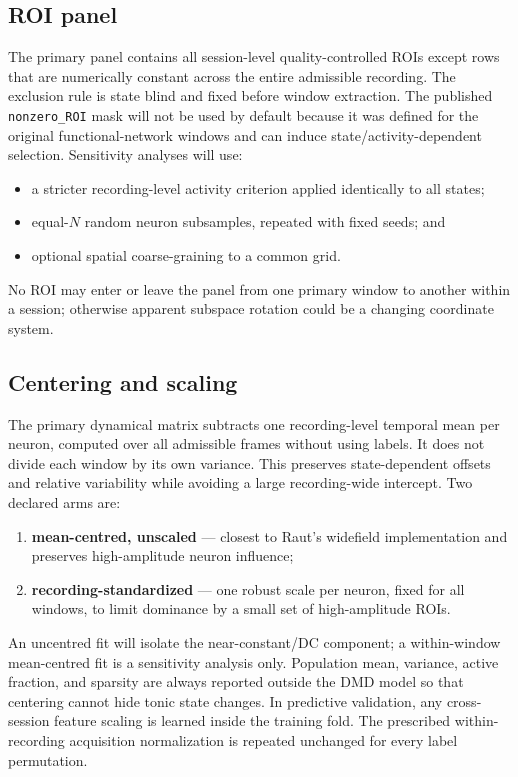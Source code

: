 \documentclass[11pt,a4paper]{article}
\begin{document}
\subsection{ROI panel}

The primary panel contains all session-level quality-controlled ROIs except rows that are numerically constant across the entire admissible recording. The exclusion rule is state blind and fixed before window extraction. The published \texttt{nonzero\_ROI} mask will not be used by default because it was defined for the original functional-network windows and can induce state/activity-dependent selection. Sensitivity analyses will use:

\begin{itemize}
  \item a stricter recording-level activity criterion applied identically to all states;
  \item equal-$N$ random neuron subsamples, repeated with fixed seeds; and
  \item optional spatial coarse-graining to a common grid.
\end{itemize}

No ROI may enter or leave the panel from one primary window to another within a session; otherwise apparent subspace rotation could be a changing coordinate system.

\subsection{Centering and scaling}

The primary dynamical matrix subtracts one recording-level temporal mean per neuron, computed over all admissible frames without using labels. It does not divide each window by its own variance. This preserves state-dependent offsets and relative variability while avoiding a large recording-wide intercept. Two declared arms are:

\begin{enumerate}
  \item \textbf{mean-centred, unscaled} --- closest to Raut's widefield implementation and preserves high-amplitude neuron influence;
  \item \textbf{recording-standardized} --- one robust scale per neuron, fixed for all windows, to limit dominance by a small set of high-amplitude ROIs.
\end{enumerate}

An uncentred fit will isolate the near-constant/DC component; a within-window mean-centred fit is a sensitivity analysis only. Population mean, variance, active fraction, and sparsity are always reported outside the DMD model so that centering cannot hide tonic state changes. In predictive validation, any cross-session feature scaling is learned inside the training fold. The prescribed within-recording acquisition normalization is repeated unchanged for every label permutation.
\end{document}
